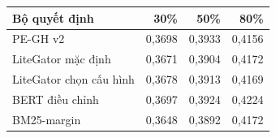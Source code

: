 \begin{tabularx}{\textwidth}{@{}Yrrr@{}}
\hline
Bộ quyết định & 30\% & 50\% & 80\% \\\hline
PE-GH v2 & 0,3698 & 0,3933 & 0,4156 \\
LiteGator mặc định & 0,3671 & 0,3904 & 0,4172 \\
LiteGator chọn cấu hình & 0,3678 & 0,3913 & 0,4169 \\
BERT điều chỉnh & 0,3697 & 0,3924 & 0,4224 \\
BM25-margin & 0,3648 & 0,3892 & 0,4172 \\
\hline
\end{tabularx}
